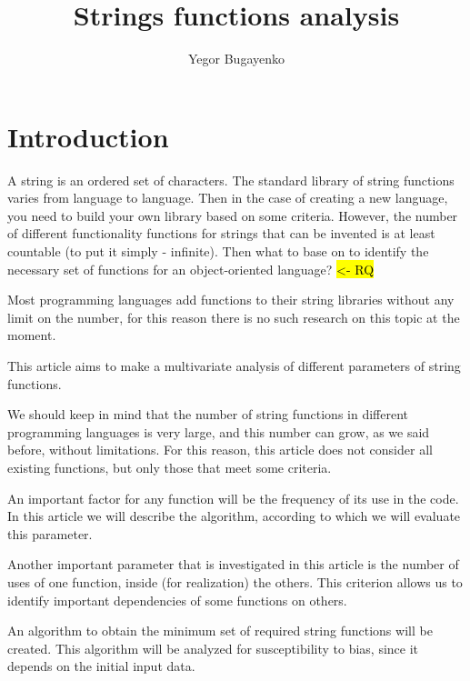 \documentclass[anonymous,sigplan,review,11pt,nonacm,natbib=false]{acmart}
\title{Strings functions analysis}
\author{Yegor Bugayenko}
\affiliation{Huawei\city{Moscow}\country{Russia}}
\begin{document}
    \raggedbottom

    \begin{abstract}
    \end{abstract}

    \maketitle

    \section{Introduction}\label{sec:intro}

    A string is an ordered set of characters. The standard library of string functions varies from language to language. Then in the case of creating a new language, you need to build your own library based on some criteria. However, the number of different functionality functions for strings that can be invented is at least countable (to put it simply - infinite). Then what to base on to identify the necessary set of functions for an object-oriented language? \hl{<- RQ}

    Most programming languages add functions to their string libraries without any limit on the number, for this reason there is no such research on this topic at the moment.

    This article aims to make a multivariate analysis of different parameters of string functions.

    We should keep in mind that the number of string functions in different programming languages is very large, and this number can grow, as we said before, without limitations. For this reason, this article does not consider all existing functions, but only those that meet some criteria.

    An important factor for any function will be the frequency of its use in the code. In this article we will describe the algorithm, according to which we will evaluate this parameter.

    Another important parameter that is investigated in this article is the number of uses of one function, inside (for realization) the others. This criterion allows us to identify important dependencies of some functions on others.

    An algorithm to obtain the minimum set of required string functions will be created. This algorithm will be analyzed for susceptibility to bias, since it depends on the initial input data.
\end{document}
